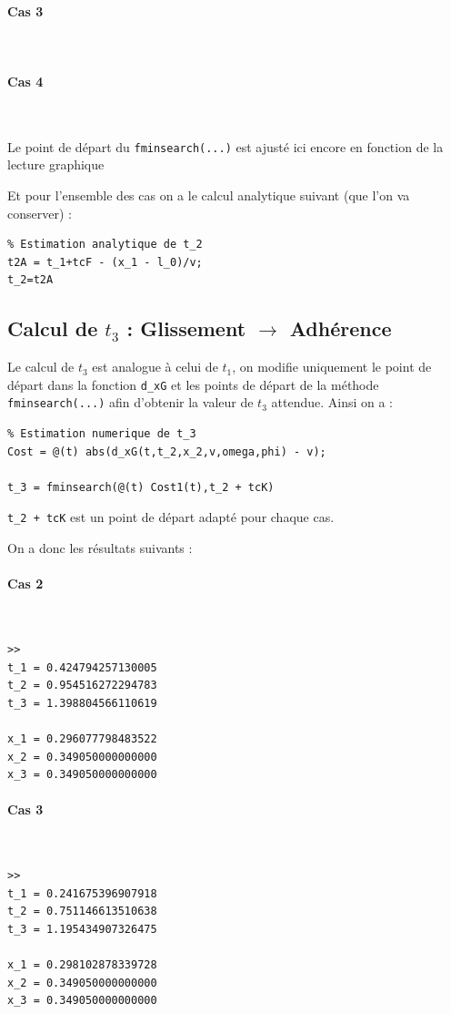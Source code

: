 \documentclass{article}
\begin{document}
\paragraph{Cas 3}
$ $

\paragraph{Cas 4}
$ $

Le point de départ du \verb|fminsearch(...)| est ajusté ici encore en fonction de la lecture graphique 

Et pour l'ensemble des cas on a le calcul analytique suivant (que l'on va conserver) :

\begin{lstlisting}
% Estimation analytique de t_2
t2A = t_1+tcF - (x_1 - l_0)/v;
t_2=t2A
\end{lstlisting}

\subsection{Calcul de $t_3$ : Glissement $\rightarrow$ Adhérence}
Le calcul de $t_3$ est analogue à celui de $t_1$, on modifie uniquement le point de départ dans la fonction \verb|d_xG| et les points de départ de la méthode \verb|fminsearch(...)| afin d'obtenir la valeur de $t_3$ attendue. Ainsi on a :

\begin{lstlisting}
% Estimation numerique de t_3
Cost = @(t) abs(d_xG(t,t_2,x_2,v,omega,phi) - v);

t_3 = fminsearch(@(t) Cost1(t),t_2 + tcK)		
\end{lstlisting}

\verb|t_2 + tcK| est un point de départ adapté pour chaque cas. 

On a donc les résultats suivants : 

\paragraph{Cas 2}
$ $
\begin{lstlisting}
>>
t_1 = 0.424794257130005
t_2 = 0.954516272294783
t_3 = 1.398804566110619

x_1 = 0.296077798483522
x_2 = 0.349050000000000
x_3 = 0.349050000000000
\end{lstlisting}
\paragraph{Cas 3}
$ $
\begin{lstlisting}
>>
t_1 = 0.241675396907918
t_2 = 0.751146613510638
t_3 = 1.195434907326475

x_1 = 0.298102878339728
x_2 = 0.349050000000000
x_3 = 0.349050000000000
\end{lstlisting}
\end{document}
